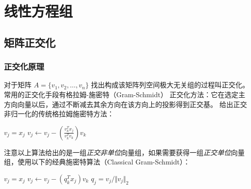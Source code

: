 \chapter[short]{线性方程组}

\section{矩阵正交化}
\subsection{正交化原理}
对于矩阵 $A=\{v_1,v_2,\dots,v_n\}$ 找出构成该矩阵列空间极大无关组的过程叫正交化。常用的正交化手段有格拉姆-施密特（Gram-Schmidt）
正交化方法：它在选定主方向向量以后，通过不断减去其余方向在该方向上的投影得到正交基。
给出正交非归一化的传统格拉姆施密特方法：
\begin{center}
    \begin{minipage}{.7\linewidth}
        \begin{algorithm}[H]
            \caption{}
            {
                $v_j=x_j$\;
                {
                    $v_j\leftarrow v_j-(\frac{v_k^Tx_j}{v_k^Tv_k})v_k$\;
                }
            }
        \end{algorithm}
    \end{minipage}
\end{center}
注意以上算法给出的是一组\emph{正交非单位}向量组，如果需要获得一组\emph{正交单位}向量组，使用以下的经典施密特算法（Classical Gram-Schmidt）：
\begin{center}
    \begin{minipage}{.7\linewidth}
        \begin{algorithm}[H]
            \caption{}
            {
                $v_j=x_j$\;
                {
                    $v_j\leftarrow v_j-(q_k^Tx_j)v_k$\;
                }
                $q_j=v_j/\Vert v_j\Vert_2$\;
            }
        \end{algorithm}
    \end{minipage}
\end{center}

